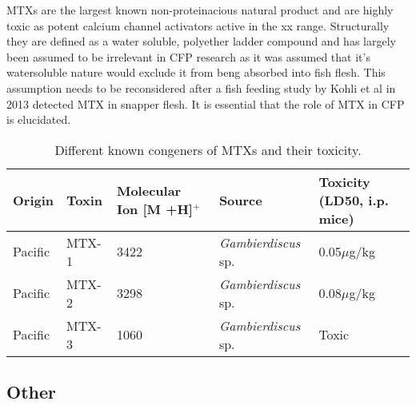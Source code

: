 \documentclass[12pt]{article}
\begin{document}
MTXs are the largest known non-proteinacious natural product and are highly toxic as potent calcium channel activators active in the xx range. Structurally they are defined as a water soluble, polyether ladder compound and has largely been assumed to be irrelevant in CFP research as it was assumed that it's watersoluble nature would exclude it from beng absorbed into fish flesh. This assumption needs to be reconsidered after a fish feeding study by Kohli et al in 2013 detected MTX in  snapper flesh. It is essential that the role of MTX in CFP is elucidated. 

\begin{sidewaystable}[!htbp]
\caption{Different known congeners of MTXs and their toxicity.}
\begin{tabular}{ |  p{4cm} | p{4cm} | p{4cm} | p{4cm} | p{4cm} | }
\hline
\textbf{Origin} & \textbf{Toxin} & \textbf{Molecular Ion [M +H]$^{+}$} & \textbf{Source} & \textbf{Toxicity (LD50, i.p. mice)} \\
\hline
 Pacific & MTX-1 & 3422 \cite{holmes1994purification,murata1993structure} & \emph{Gambierdiscus} sp. \cite{holmes1994purification} & 0.05$\mu$g/kg \cite{murata1993structure}\\
\hline
 Pacific & MTX-2 & 3298 \cite{holmes1994purification} & \emph{Gambierdiscus} sp. \cite{holmes1994purification} & 0.08$\mu$g/kg \cite{holmes1994purification}\\
\hline
 Pacific & MTX-3 & 1060   \cite{holmes1994purification} & \emph{Gambierdiscus} sp. \cite{holmes1994purification} & Toxic \cite{holmes1994purification} \\
\hline
\end{tabular}
\end{sidewaystable}
\FloatBarrier

\subsection{Other}
\end{document}
